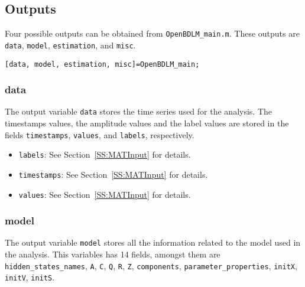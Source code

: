 {\subsection{Outputs}

 Four possible outputs can be obtained from \lstinline[basicstyle = \mlttfamily \small]!OpenBDLM_main.m!.
 These outputs are \lstinline[basicstyle = \mlttfamily \small ]!data!, \lstinline[basicstyle = \mlttfamily \small ]!model!, \lstinline[basicstyle = \mlttfamily \small ]!estimation!, and \lstinline[basicstyle = \mlttfamily \small ]!misc!.\\
 
 \raggedright{\colorbox{light-gray}{\lstinline[basicstyle = \mlttfamily \small]![data, model, estimation, misc]=OpenBDLM_main;!}} \\

\subsubsection{data} 

The output variable \lstinline[basicstyle = \mlttfamily \small]!data! stores the time series used for the analysis. 
The timestamps values, the amplitude values and the label values are stored in the fields \lstinline[basicstyle = \mlttfamily \small ]!timestamps!, \lstinline[basicstyle = \mlttfamily \small ]!values!, and \lstinline[basicstyle = \mlttfamily \small ]!labels!, respectively.
\begin{itemize}
\item \lstinline[basicstyle = \mlttfamily \small ]!labels!:  See Section~\ref{SS:MATInput} for details.
\item \lstinline[basicstyle = \mlttfamily \small ]!timestamps!:  See Section~\ref{SS:MATInput} for details.
\item \lstinline[basicstyle = \mlttfamily \small ]!values!:  See Section~\ref{SS:MATInput} for details.
\end{itemize}

\subsubsection{model}
The output variable \lstinline[basicstyle = \mlttfamily \small]!model! stores all the information related to the model used in the analysis. 
This variables has 14 fields, amongst them are \lstinline[basicstyle = \mlttfamily \small ]!hidden_states_names!, \lstinline[basicstyle = \mlttfamily \small ]!A!, \lstinline[basicstyle = \mlttfamily \small ]!C!, \lstinline[basicstyle = \mlttfamily \small ]!Q!, \lstinline[basicstyle = \mlttfamily \small ]!R!, \lstinline[basicstyle = \mlttfamily \small ]!Z!, \lstinline[basicstyle = \mlttfamily \small ]!components!, \lstinline[basicstyle = \mlttfamily \small ]!parameter_properties!, \lstinline[basicstyle = \mlttfamily \small ]!initX!, \lstinline[basicstyle = \mlttfamily \small ]!initV!, \lstinline[basicstyle = \mlttfamily \small ]!initS!.


}
